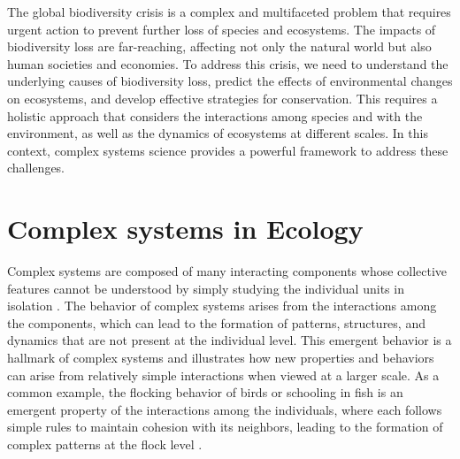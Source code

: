 The global biodiversity crisis is a complex and multifaceted problem that
requires urgent action to prevent further loss of species and ecosystems. The
impacts of biodiversity loss are far-reaching, affecting not only the natural
world but also human societies and economies. To address this crisis, we need
to understand the underlying causes of biodiversity loss, predict the effects
of environmental changes on ecosystems, and develop effective strategies for
conservation. This requires a holistic approach that considers the interactions
among species and with the environment, as well as the dynamics of ecosystems
at different scales. In this context, complex systems science provides a
powerful framework to address these challenges.

\section{\label{sec:Complex systems in Ecology} Complex systems in Ecology}

Complex systems are composed of many interacting components
whose collective features cannot be understood by simply studying the
individual units in isolation \cite{Bianconi_2023}. The behavior of
complex systems arises from the interactions among the components, which can
lead to the formation of patterns, structures, and dynamics that are not
present at the individual level. This emergent behavior is a hallmark of
complex systems and illustrates how new properties and behaviors can arise from
relatively simple interactions when viewed at a larger scale. As a common
example, the flocking behavior of birds or schooling in fish is an emergent
property of the interactions among the individuals, where each follows simple
rules to maintain cohesion with its neighbors, leading to the formation of
complex patterns at the flock level \cite{Vicsek1995}.


